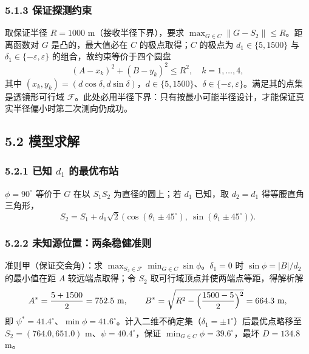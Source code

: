 \documentclass[UTF8, zihao=5,AutoFakeBold=2]{ctexart}
\begin{document}
		\subsubsection*{5.1.3 保证探测约束}
		取保证半径 \(R=1000\) m（接收半径下界），要求 \(\max_{G\in C}\lVert G-S_2\rVert\le R\)。距离函数对 \(G\) 是凸的，最大值必在 \(C\) 的极点取得；\(C\) 的极点为 \(d_1\in\{5,1500\}\) 与 \(\delta_1\in\{-\varepsilon,\varepsilon\}\) 的组合，故约束等价于四个圆盘
		\begin{equation}
			(A-x_k)^2+(B-y_k)^2\le R^2,\quad k=1,\dots,4,
			\label{eq:lens}
		\end{equation}
		其中 \((x_k,y_k)=(d\cos\delta,d\sin\delta)\)，\(d\in\{5,1500\}\)、\(\delta\in\{-\varepsilon,\varepsilon\}\)。满足其的点集是透镜形可行域 \(\mathcal F\)。此处必用半径下界：只有按最小可能半径设计，才能保证真实半径偏小时第二次测向仍成功。

	\subsection*{5.2 模型求解}
		\subsubsection*{5.2.1 已知 \(d_1\) 的最优布站}
		\(\phi=90^\circ\) 等价于 \(G\) 在以 \(S_1S_2\) 为直径的圆上；若 \(d_1\) 已知，取 \(d_2=d_1\) 得等腰直角三角形，
		\begin{equation}
			S_2=S_1+d_1\sqrt2\,\bigl(\cos(\theta_1\pm45^\circ),\ \sin(\theta_1\pm45^\circ)\bigr).
			\label{eq:known}
		\end{equation}

		\subsubsection*{5.2.2 未知源位置：两条稳健准则}
		准则甲（保证交会角）：求 \(\max_{S_2\in\mathcal F}\min_{G\in C}\sin\phi\)。\(\delta_1=0\) 时 \(\sin\phi=|B|/d_2\) 的最小值在距 \(A\) 较远端点取得；令 \(S_2\) 取可行域顶点并使两端点等距，得解析解
		\begin{equation}
			A^\ast=\frac{5+1500}{2}=752.5\ \text{m},\qquad
			B^\ast=\sqrt{R^2-\Bigl(\frac{1500-5}{2}\Bigr)^2}=664.3\ \text{m},
			\label{eq:criterionA}
		\end{equation}
		即 \(\psi^\ast=41.4^\circ\)、\(\min\phi=41.6^\circ\)。计入二维不确定集（\(\delta_1=\pm1^\circ\)）后最优点略移至 \(S_2=(764.0,651.0)\) m、\(\psi=40.4^\circ\)，保证 \(\min_{G\in C}\phi=39.6^\circ\)，最坏 \(D=134.8\) m。
\end{document}
